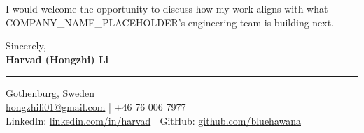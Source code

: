 \documentclass[a4paper,10pt]{article}
\begin{document}
I would welcome the opportunity to discuss how my work aligns with what COMPANY_NAME_PLACEHOLDER's engineering team is building next.

\vspace{15pt}

Sincerely,\\[15pt]
\textbf{Harvad (Hongzhi) Li}

\vspace{25pt}
{\color{linkedinblue}\rule{\linewidth}{0.6pt}}
\vspace{6pt}

{\color{linkedinblue}
  Gothenburg, Sweden\\
  \href{mailto:hongzhili01@gmail.com}{hongzhili01@gmail.com} | +46 76 006 7977\\
  LinkedIn: \href{https://www.linkedin.com/in/harvad/}{linkedin.com/in/harvad} |
  GitHub: \href{https://github.com/bluehawana}{github.com/bluehawana}
}
\end{document}
